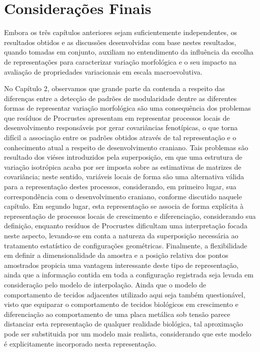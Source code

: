 \documentclass[12pt,twoside]{report}
\begin{document}

\newpage
\chapter{Considerações Finais}
\label{ch:fin}

Embora os três capítulos anteriores sejam suficientemente independentes,
os resultados obtidos e as discussões desenvolvidas com base nestes
resultados, quando tomadas em conjunto, auxiliam no entendimento da
influência da escolha de representações para caracterizar variação
morfológica e o seu impacto na avaliação de propriedades variacionais em
escala macroevolutiva.

No Capítulo 2, observamos que grande parte da contenda a respeito das
diferenças entre a detecção de padrões de modularidade dentre as
diferentes formas de representar variação morfológica são uma
consequência dos problemas que resíduos de Procrustes apresentam em
representar processos locais de desenvolvimento responsáveis por gerar
covariâncias fenotípicas, o que torna difícil a associação entre os
padrões obtidos através de tal representação e o conhecimento atual a
respeito de desenvolvimento craniano. Tais problemas são resultado dos
viéses introduzidos pela superposição, em que uma estrutura de variação
isotrópica acaba por ser imposta sobre as estimativas de matrizes de
covariância; neste sentido, variáveis locais de forma são uma
alternativa válida para a representação destes processos, considerando,
em primeiro lugar, sua correspondência com o desenvolvimento craniano,
conforme discutido naquele capítulo. Em segundo lugar, esta
representação se associa de forma explícita à representação de processos
locais de crescimento e diferenciação, considerando sua definição,
enquanto resíduos de Procrustes dificultam uma interpretação focada
neste aspecto, levando-se em conta a natureza da superposição necessária
ao tratamento estatístico de configurações geométricas. Finalmente, a
flexibilidade em definir a dimensionalidade da amostra e a posição
relativa dos pontos amostrados propicia uma vantagem interessante deste
tipo de representação, ainda que a informação contida em toda a
configuração registrada seja levada em consideração pelo modelo de
interpolação. Ainda que o modelo de comportamento de tecidos adjacentes
utilizado aqui seja também questionável, visto que equiparar o
comportamento de tecidos biológicos em crescimento e diferenciação ao
comportamento de uma placa metálica sob tensão parece distanciar esta
representação de qualquer realidade biológica, tal aproximação pode ser
substituida por um modelo mais realista, considerando que este modelo é
explicitamente incorporado nesta representação.
\end{document}
